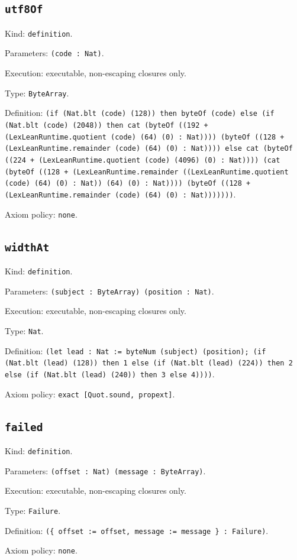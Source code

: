 \documentclass[11pt]{article}
\begin{document}
\subsection*{\texttt{utf8Of}}
\noindent Kind: \texttt{definition}.\par
\noindent Parameters: \texttt{(code : Nat)}.\par
\noindent Execution: executable, non-escaping closures only.\par
\noindent Type: \texttt{ByteArray}.\par
\noindent Definition: \texttt{(if (Nat.blt (code) (128)) then byteOf (code) else (if (Nat.blt (code) (2048)) then cat (byteOf ((192 + (LexLeanRuntime.quotient (code) (64) (0) : Nat)))) (byteOf ((128 + (LexLeanRuntime.remainder (code) (64) (0) : Nat)))) else cat (byteOf ((224 + (LexLeanRuntime.quotient (code) (4096) (0) : Nat)))) (cat (byteOf ((128 + (LexLeanRuntime.remainder ((LexLeanRuntime.quotient (code) (64) (0) : Nat)) (64) (0) : Nat)))) (byteOf ((128 + (LexLeanRuntime.remainder (code) (64) (0) : Nat)))))))}.\par
\noindent Axiom policy: \texttt{none}.\par
\subsection*{\texttt{widthAt}}
\noindent Kind: \texttt{definition}.\par
\noindent Parameters: \texttt{(subject : ByteArray) (position : Nat)}.\par
\noindent Execution: executable, non-escaping closures only.\par
\noindent Type: \texttt{Nat}.\par
\noindent Definition: \texttt{(let lead : Nat := byteNum (subject) (position); (if (Nat.blt (lead) (128)) then 1 else (if (Nat.blt (lead) (224)) then 2 else (if (Nat.blt (lead) (240)) then 3 else 4))))}.\par
\noindent Axiom policy: \texttt{exact [Quot.sound, propext]}.\par
\subsection*{\texttt{failed}}
\noindent Kind: \texttt{definition}.\par
\noindent Parameters: \texttt{(offset : Nat) (message : ByteArray)}.\par
\noindent Execution: executable, non-escaping closures only.\par
\noindent Type: \texttt{Failure}.\par
\noindent Definition: \texttt{(\{ offset := offset, message := message \} : Failure)}.\par
\noindent Axiom policy: \texttt{none}.\par
\end{document}
